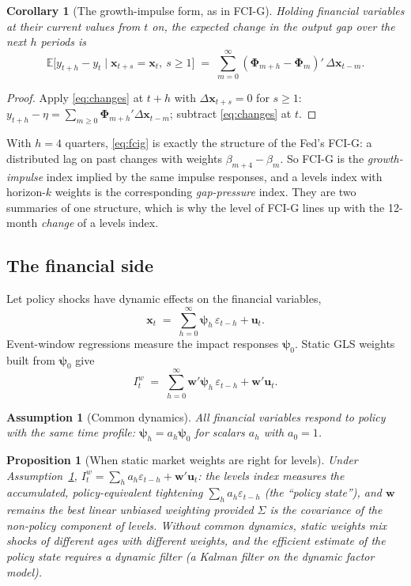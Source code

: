 \documentclass[11pt]{article}
\newtheorem{proposition}{Proposition}
\newtheorem{assumption}{Assumption}
\newtheorem{corollary}{Corollary}
\theoremstyle{definition}
\theoremstyle{remark}
\newcommand{\E}{\mathbb{E}}
\newcommand{\bpsi}{\boldsymbol{\psi}}
\newcommand{\bx}{\mathbf{x}}
\newcommand{\bu}{\mathbf{u}}
\newcommand{\bw}{\mathbf{w}}
\newcommand{\bPhi}{\boldsymbol{\Phi}}
\begin{document}
\begin{corollary}[The growth-impulse form, as in FCI-G]
Holding financial variables at their current values from $t$ on, the expected change in the output gap over the next $h$ periods is
\begin{equation}\label{eq:fcig}
\E\bigl[y_{t+h}-y_t\mid \bx_{t+s}=\bx_t,\ s\ge 1\bigr] \;=\; \sum_{m=0}^{\infty}(\bPhi_{m+h}-\bPhi_m)'\,\Delta\bx_{t-m}.
\end{equation}
\end{corollary}

\begin{proof}
Apply \eqref{eq:changes} at $t+h$ with $\Delta\bx_{t+s}=0$ for $s\ge1$: $y_{t+h}-\eta=\sum_{m\ge0}\bPhi_{m+h}'\Delta\bx_{t-m}$; subtract \eqref{eq:changes} at $t$.
\end{proof}

\noindent With $h=4$ quarters, \eqref{eq:fcig} is exactly the structure of the Fed's FCI-G: a distributed lag on past changes with weights $\beta_{m+4}-\beta_m$. So FCI-G is the \emph{growth-impulse} index implied by the same impulse responses, and a levels index with horizon-$k$ weights is the corresponding \emph{gap-pressure} index. They are two summaries of one structure, which is why the level of FCI-G lines up with the 12-month \emph{change} of a levels index.

\subsection{The financial side}

Let policy shocks have dynamic effects on the financial variables,
\[
\bx_t \;=\; \sum_{h=0}^{\infty}\bpsi_h\,\varepsilon_{t-h} + \bu_t .
\]
Event-window regressions measure the impact responses $\bpsi_0$. Static GLS weights built from $\bpsi_0$ give
\[
I^w_t \;=\; \sum_{h=0}^{\infty}\bw'\bpsi_h\,\varepsilon_{t-h} + \bw'\bu_t .
\]

\begin{assumption}[Common dynamics]\label{ass:common}
All financial variables respond to policy with the same time profile: $\bpsi_h=a_h\bpsi_0$ for scalars $a_h$ with $a_0=1$.
\end{assumption}

\begin{proposition}[When static market weights are right for levels]\label{prop:mktlevels}
Under Assumption~\ref{ass:common}, $I^w_t=\sum_h a_h\varepsilon_{t-h}+\bw'\bu_t$: the levels index measures the accumulated, policy-equivalent tightening $\sum_h a_h\varepsilon_{t-h}$ (the ``policy state''), and $\bw$ remains the best linear unbiased weighting provided $\Sigma$ is the covariance of the non-policy component \emph{of levels}. Without common dynamics, static weights mix shocks of different ages with different weights, and the efficient estimate of the policy state requires a dynamic filter (a Kalman filter on the dynamic factor model).
\end{proposition}
\end{document}
